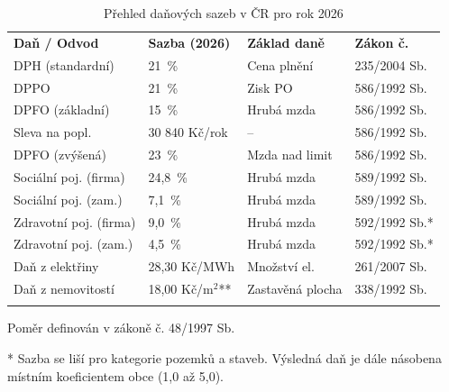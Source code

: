 \begin{table}[t] \centering \setlength{\tabcolsep}{8pt} \small

    \caption{Přehled daňových sazeb v ČR pro rok 2026}
    \label{tab:cz_dane_sazby}
    
    \begin{tabular}{llll}
        \toprule
        \addlinespace
        \textbf{Daň / Odvod} & \textbf{Sazba (2026)} & \textbf{Základ daně} & \textbf{Zákon č.} \\
        \addlinespace
        \midrule
        
        \addlinespace
        DPH (standardní) & 21~\% & Cena plnění & 235/2004 Sb. \\
        DPPO & 21~\% & Zisk PO & 586/1992 Sb. \\
        DPFO (základní) & 15~\% & Hrubá mzda & 586/1992 Sb. \\
        Sleva na popl. & 30 840 Kč/rok & -- & 586/1992 Sb. \\
        DPFO (zvýšená) & 23~\% & Mzda nad limit & 586/1992 Sb. \\
        
        \addlinespace
        
        Sociální poj. (firma) & 24,8~\% & Hrubá mzda & 589/1992 Sb. \\
        Sociální poj. (zam.) & 7,1~\% & Hrubá mzda & 589/1992 Sb. \\
        Zdravotní poj. (firma) & 9,0~\% & Hrubá mzda & 592/1992 Sb.* \\
        Zdravotní poj. (zam.) & 4,5~\% & Hrubá mzda & 592/1992 Sb.* \\
        
        \addlinespace
        
        Daň z elektřiny & 28,30 Kč/MWh & Množství el. & 261/2007 Sb. \\
        Daň z nemovitostí & 18,00 Kč/m$^2$** & Zastavěná plocha & 338/1992 Sb. \\
        
        \addlinespace
        \bottomrule
    \end{tabular}

    \vspace{2mm}
    \begin{minipage}{0.93\textwidth}
        \footnotesize * Poměr definován v zákoně č. 48/1997 Sb.
        
        \footnotesize ** Sazba se liší pro kategorie pozemků a staveb. Výsledná daň je dále násobena místním koeficientem obce (1,0 až 5,0).
    \end{minipage}
    
\end{table}


